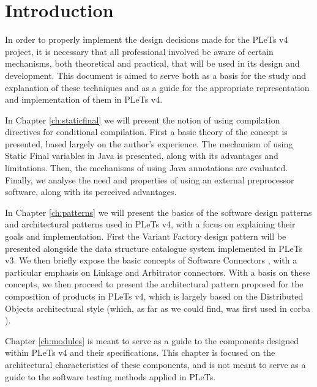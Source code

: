 \chapter*{Introduction}

In order to properly implement the design decisions made for the PLeTs v4 project, it is necessary that all professional involved be aware of certain mechanisms, both theoretical and practical, that will be used in its design and development. This document is aimed to serve both as a basis for the study and explanation of these techniques and as a guide for the appropriate representation and implementation of them in PLeTs v4.

In Chapter \ref{ch:staticfinal} we will present the notion of using compilation directives for conditional compilation. First a basic theory of the concept is presented, based largely on the author's experience. The mechanism of using Static Final variables in Java is presented, along with its advantages and limitations. Then, the mechanisms of using Java annotations are evaluated. Finally, we analyse the need and properties of using an external preprocessor software, along with its perceived advantages.

In Chapter \ref{ch:patterns} we will present the basics of the software design patterns and architectural patterns used in PLeTs v4, with a focus on explaining their goals and implementation. First the Variant Factory design pattern will be presented \cite{LASER:2015} alongside the data structure catalogue system implemented in PLeTs v3. We then briefly expose the basic concepts of Software Connectors \cite{TAYLOR:2009}, with a particular emphasis on Linkage and Arbitrator connectors. With a basis on these concepts, we then proceed to present the architectural pattern proposed for the composition of products in PLeTs v4, which is largely based on the Distributed Objects architectural style (which, as far as we could find, was first used in \acrshort{corba} \cite{CORBA:2012}).

Chapter \ref{ch:modules} is meant to serve as a guide to the components designed within PLeTs v4 and their specifications. This chapter is focused on the architectural characteristics of these components, and is not meant to serve as a guide to the software testing methods applied in PLeTs.
